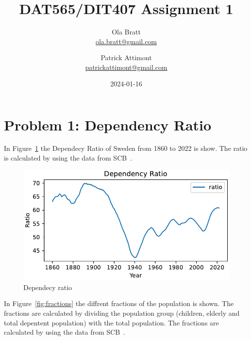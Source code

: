 \documentclass[a4paper]{article}
\begin{document}
\author{Ola Bratt \\
  \href{mailto:ola.bratt@gmail.com}{ola.bratt@gmail.com}
  \and
  Patrick Attimont \\
  \href{patrickattimont@gmail.com}{patrickattimont@gmail.com}
}

\title{DAT565/DIT407 Assignment 1}
\date{2024-01-16}

\maketitle



\section*{Problem 1: Dependency Ratio}

In Figure~\ref{fig:ratio} the Dependecy Ratio of Sweden from 1860 to 2022 is show.
The ratio is calculated by using the data from SCB~\cite{SCB:2023}.



\begin{figure}[h]
  \begin{center}
    \includegraphics[width=\textwidth]{ratio.pdf}
    \caption{Dependecy ratio}
    \label{fig:ratio}
  \end{center}
\end{figure}

\newpage

In Figure~\ref{fig:fractions} the diffrent fractions of the population is shown. The fractions 
are calculated by dividing the population group (children, elderly and total depentent population) with the total population. 
The fractions are calculated by using the data from SCB~\cite{SCB:2023}.
\end{document}
